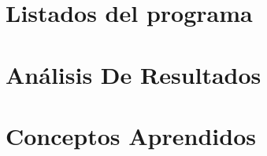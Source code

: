 \documentclass[12pt,letterpapers]{IEEEtran}
\begin{document}
\section{Listados del programa}

\section{Análisis De Resultados}

\section{Conceptos Aprendidos}  
\end{document}
